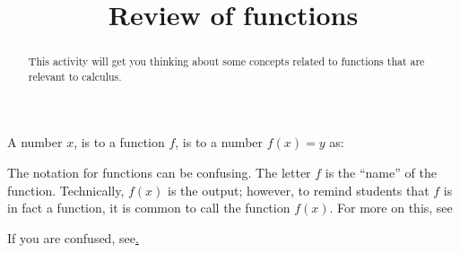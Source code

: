 \documentclass{ximera}
\title{Review of functions}
\begin{document}
\begin{abstract}
  This activity will get you thinking about some concepts related to
  functions that are relevant to calculus.
\end{abstract}
\maketitle


\begin{question}
  A number $x$, is to a function $f$, is to a number $f(x)=y$ as:
    \begin{hint}
      The notation for functions can be confusing. The letter $f$ is
      the ``name'' of the function. Technically, $f(x)$ is the output;
      however, to remind students that $f$ is in fact a function, it
      is common to call the function $f(x)$. For more on this,
      see
    \end{hint}
    \begin{hint}
      If you are confused, see\href{http://en.wikipedia.org/wiki/Function_(mathematics)}.
    \end{hint}
\begin{prompt} 
   \begin{multiple-choice}
    \end{multiple-choice}
\end{prompt}
\end{question}
\end{document}

